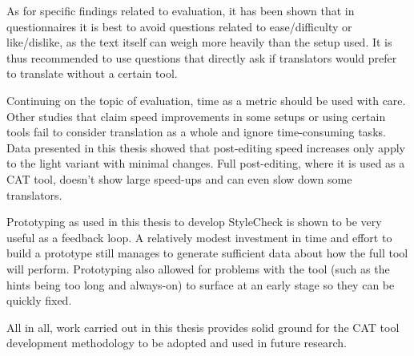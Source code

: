 As for specific findings related to evaluation, it has been shown that in questionnaires it is best to avoid questions related to ease/difficulty or like/dislike, as the text itself can weigh more heavily than the setup used. It is thus recommended to use questions that directly ask if translators would prefer to translate without a certain tool.

Continuing on the topic of evaluation, time as a metric should be used with care. Other studies that claim speed improvements in some setups or using certain tools fail to consider translation as a whole and ignore time-consuming tasks. Data presented in this thesis showed that post-editing speed increases only apply to the light variant with minimal changes. Full post-editing, where it is used as a \ac{CAT} tool, doesn't show large speed-ups and can even slow down some translators.

Prototyping as used in this thesis to develop StyleCheck is shown to be very useful as a feedback loop. A relatively modest investment in time and effort to build a prototype still manages to generate sufficient data about how the full tool will perform. Prototyping also allowed for problems with the tool (such as the hints being too long and always-on) to surface at an early stage so they can be quickly fixed.

All in all, work carried out in this thesis provides solid ground for the \ac{CAT} tool development methodology to be adopted and used in future research.
